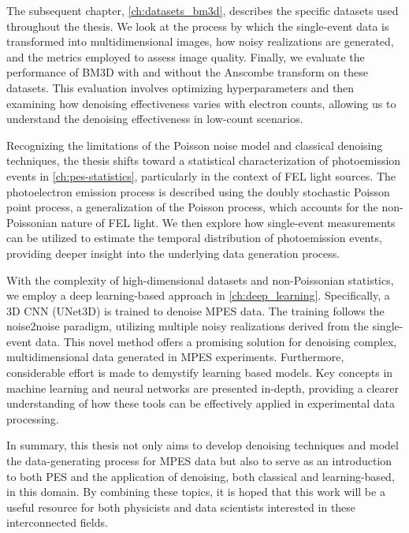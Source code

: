The subsequent chapter, \cref{ch:datasets_bm3d}, describes the specific datasets used throughout the thesis. We look at the  process by which the single-event data is transformed into multidimensional images, how noisy realizations are generated, and the metrics employed to assess image quality. Finally, we evaluate the performance of \gls{BM3D} with and without the Anscombe transform on these datasets. This evaluation involves optimizing hyperparameters and then examining how denoising effectiveness varies with electron counts, allowing us to understand the denoising effectiveness in low-count scenarios.

Recognizing the limitations of the Poisson noise model and classical denoising techniques, the thesis shifts toward a statistical characterization of photoemission events in \cref{ch:pes-statistics}, particularly in the context of \gls{FEL} light sources. The photoelectron emission process is described using the doubly stochastic Poisson point process, a generalization of the Poisson process, which accounts for the non-Poissonian nature of \gls{FEL} light. We then explore how single-event measurements can be utilized to estimate the temporal distribution of photoemission events, providing deeper insight into the underlying data generation process.

With the complexity of high-dimensional datasets and non-Poissonian statistics, we employ a deep learning-based approach in \cref{ch:deep_learning}. Specifically, a 3D \gls{CNN} (UNet3D) is trained to denoise \gls{MPES} data. The training follows the \gls{noise2noise} paradigm, utilizing multiple noisy realizations derived from the single-event data. This novel method offers a promising solution for denoising complex, multidimensional data generated in \gls{MPES} experiments. Furthermore, considerable effort is made to demystify learning based models. Key concepts in machine learning and neural networks are presented in-depth, providing a clearer understanding of how these tools can be effectively applied in experimental data processing.

In summary, this thesis not only aims to develop denoising techniques and model the data-generating process for \gls{MPES} data but also to serve as an introduction to both \gls{PES} and the application of denoising, both classical and learning-based, in this domain. By combining these topics, it is hoped that this work will be a useful resource for both physicists and data scientists interested in these interconnected fields.